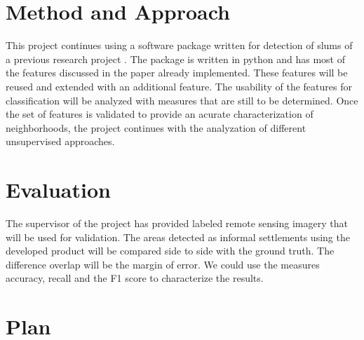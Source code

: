 \documentclass{article}
\begin{document}
\section{Method and Approach}

This project continues using a software package written for detection of slums
of a previous research project \cite{graesser2012image}. The package is written
in python and has most of the features discussed in the paper already
implemented. These features will be reused and extended with an additional
feature. The usability of the features for classification will be analyzed with
measures that are still to be determined. Once the set of features is validated
to provide an acurate characterization of neighborhoods, the project continues
with the analyzation of different unsupervised approaches.

\section{Evaluation}

The supervisor of the project has provided labeled remote sensing imagery that
will be used for validation. The areas detected as informal settlements using
the developed product will be compared side to side with the ground truth. The
difference overlap will be the margin of error. We could use the measures
accuracy, recall and the F1 score to characterize the results.

\section{Plan}

\printbibliography
\end{document}
